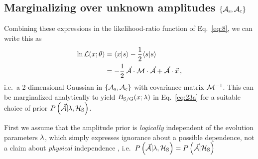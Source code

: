 \documentclass[aps,prd,onecolumn,notitlepage,nofootinbib,superscriptaddress,altaffilletter,floatfix]{revtex4-1}
\begin{document}
\subsection{Marginalizing over unknown amplitudes $\{\mathcal{A}_{\mathrm{s}},\mathcal{A}_{\mathrm{c}}\}$}
\label{sec:marg-over-unkn}

Combining these expressions in the likelihood-ratio function of Eq.~\eqref{eq:8}, we can write this as
\begin{align}
  \label{eq:21}
  \ln \mathcal{L}(x;\theta) &= \langle x|s\rangle - \frac{1}{2}\langle s|s\rangle\\
  &= -\frac{1}{2}\,\vec{\mathcal{A}}\cdot\mathcal{M}\cdot\vec{\mathcal{A}} + \vec{\mathcal{A}}\cdot\vec{x}\,,
\end{align}
i.e.\ a 2-dimensional Gaussian in $\{\mathcal{A}_{\mathrm{s}},\mathcal{A}_{\mathrm{c}}\}$ with covariance matrix $\mathcal{M}^{-1}$.
This can be marginalized analytically to yield $B_{\mathrm{S/G}}(x;\lambda)$ in Eq.~\eqref{eq:23a} for a suitable choice of prior
$P\left(\vec{\mathcal{A}}|\lambda,\mathcal{H}_{\mathrm{S}}\right)$.

First we assume that the amplitude prior is \emph{logically} independent of the evolution parameters $\lambda$, which simply expresses ignorance about a
possible dependence, not a claim about \emph{physical} independence \cite{jaynes:_logic_of_science},
i.e.\ $P\left(\vec{\mathcal{A}}|\lambda,\mathcal{H}_{\mathrm{S}}\right) = P\left(\vec{\mathcal{A}}|\mathcal{H}_{\mathrm{S}}\right)$
\end{document}
